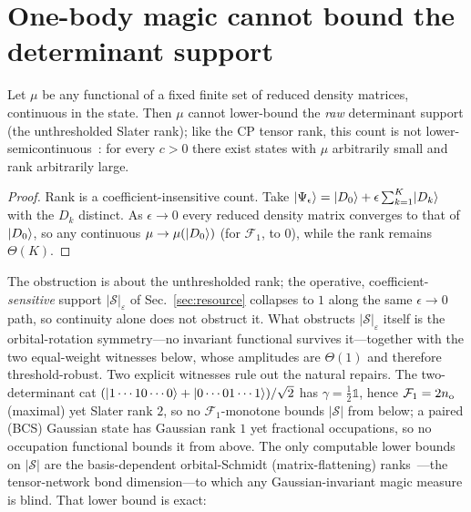 \section{One-body magic cannot bound the determinant support}
\label{app:theorem}
\begin{proposition}
\label{prop:obstruction}
Let $\mu$ be any functional of a fixed finite set of reduced density matrices, continuous in the
state. Then $\mu$ cannot lower-bound the \emph{raw} determinant support (the unthresholded Slater rank);
like the CP tensor rank, this count is not lower-semicontinuous~\cite{desilvalim2008}: for every $c>0$ there exist states with $\mu$ arbitrarily small and rank arbitrarily large.
\end{proposition}
\begin{proof}
Rank is a coefficient-insensitive count. Take
$\lvert \Psi_\epsilon \rangle=\lvert D_0 \rangle+\epsilon\sum_{k=1}^{K}\lvert D_k \rangle$ with the $D_k$ distinct. As
$\epsilon\to0$ every reduced density matrix converges to that of $\lvert D_0 \rangle$, so any continuous
$\mu\to\mu(\lvert D_0 \rangle)$ (for $\mathcal F_1$, to $0$), while the rank remains $\Theta(K)$.
\end{proof}
\noindent The obstruction is about the unthresholded rank; the operative, coefficient-\emph{sensitive}
support $|\mathcal S|_\varepsilon$ of Sec.~\ref{sec:resource} collapses to $1$ along the same
$\epsilon\to0$ path, so continuity alone does not obstruct it. What obstructs $|\mathcal S|_\varepsilon$
itself is the orbital-rotation symmetry---no invariant functional survives it---together with the two
equal-weight witnesses below, whose amplitudes are $\Theta(1)$ and therefore threshold-robust.
Two explicit witnesses rule out the natural repairs. The two-determinant cat
$(\lvert 1\cdots10\cdots0 \rangle+\lvert 0\cdots01\cdots1 \rangle)/\sqrt2$ has $\gamma=\tfrac12\mathbb 1$, hence
$\mathcal F_1=2n_{\rm o}$ (maximal) yet Slater rank $2$, so no $\mathcal F_1$-monotone bounds $|\mathcal S|$
from below; a paired (BCS) Gaussian state has Gaussian rank $1$ yet fractional occupations, so no
occupation functional bounds it from above. The only computable lower bounds on $|\mathcal S|$ are the
basis-dependent orbital-Schmidt (matrix-flattening) ranks~\cite{schollwock2011}---the tensor-network
bond dimension---to which any Gaussian-invariant magic measure is blind. That lower bound is exact:

